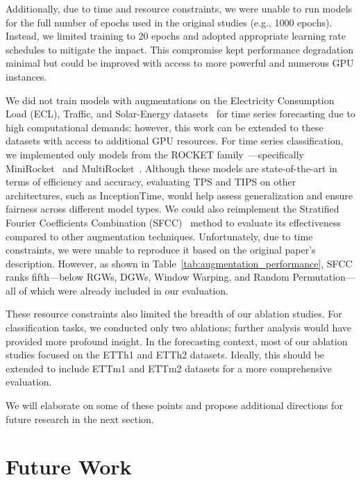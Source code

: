 Additionally, due to time and resource constraints, we were unable to run models for the full number of epochs used in the original studies (e.g., 1000 epochs). Instead, we limited training to 20 epochs and adopted appropriate learning rate schedules to mitigate the impact. This compromise kept performance degradation minimal but could be improved with access to more powerful and numerous GPU instances.



We did not train models with augmentations on the Electricity Consumption Load (ECL), Traffic, and Solar-Energy datasets~\cite{lai2018modelinglongshorttermtemporal} for time series forecasting due to high computational demands; however, this work can be extended to these datasets with access to additional GPU resources. For time series classification, we implemented only models from the ROCKET family~\cite{Dempster_2020}—specifically MiniRocket~\cite{Dempster_2021} and MultiRocket~\cite{tan2022multirocketmultiplepoolingoperators}. Although these models are state-of-the-art in terms of efficiency and accuracy, evaluating TPS and TIPS on other architectures, such as InceptionTime, would help assess generalization and ensure fairness across different model types. We could also reimplement the Stratified Fourier Coefficients Combination (SFCC)~\cite{sfccYang2023} method to evaluate its effectiveness compared to other augmentation techniques. Unfortunately, due to time constraints, we were unable to reproduce it based on the original paper's description. However, as shown in Table~\ref{tab:augmentation_performance}, SFCC ranks fifth—below RGWs, DGWs, Window Warping, and Random Permutation—all of which were already included in our evaluation.

These resource constraints also limited the breadth of our ablation studies. For classification tasks, we conducted only two ablations; further analysis would have provided more profound insight. In the forecasting context, most of our ablation studies focused on the ETTh1 and ETTh2 datasets. Ideally, this should be extended to include ETTm1 and ETTm2 datasets for a more comprehensive evaluation.

We will elaborate on some of these points and propose additional directions for future research in the next section.

\section{Future Work} \label{sec:future}



